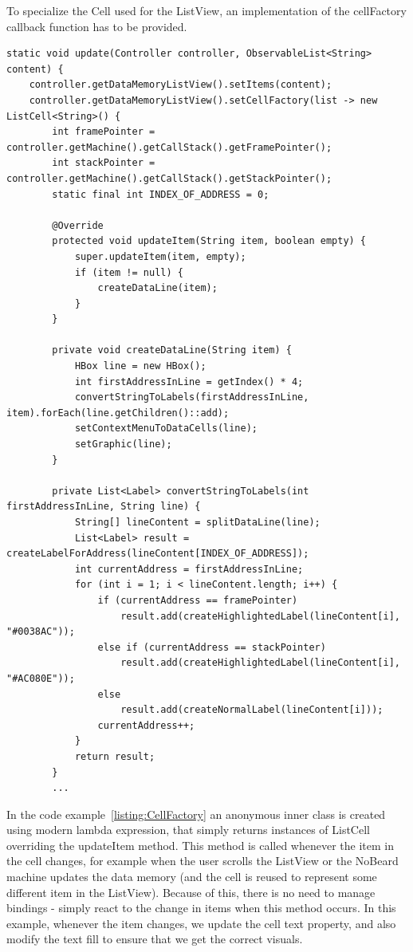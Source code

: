 To specialize the Cell used for the ListView, an implementation of the cellFactory callback function has to be provided.
\begin{lstlisting}[caption={Implementation of the data memory view using cell factory},label=listing:CellFactory]
static void update(Controller controller, ObservableList<String> content) {
    controller.getDataMemoryListView().setItems(content);
    controller.getDataMemoryListView().setCellFactory(list -> new ListCell<String>() {
        int framePointer = controller.getMachine().getCallStack().getFramePointer();
        int stackPointer = controller.getMachine().getCallStack().getStackPointer();
        static final int INDEX_OF_ADDRESS = 0;

        @Override
        protected void updateItem(String item, boolean empty) {
            super.updateItem(item, empty);
            if (item != null) {
                createDataLine(item);
            }
        }

        private void createDataLine(String item) {
            HBox line = new HBox();
            int firstAddressInLine = getIndex() * 4;
            convertStringToLabels(firstAddressInLine, item).forEach(line.getChildren()::add);
            setContextMenuToDataCells(line);
            setGraphic(line);
        }

        private List<Label> convertStringToLabels(int firstAddressInLine, String line) {
            String[] lineContent = splitDataLine(line);
            List<Label> result = createLabelForAddress(lineContent[INDEX_OF_ADDRESS]);
            int currentAddress = firstAddressInLine;
            for (int i = 1; i < lineContent.length; i++) {
                if (currentAddress == framePointer)
                    result.add(createHighlightedLabel(lineContent[i], "#0038AC"));
                else if (currentAddress == stackPointer)
                    result.add(createHighlightedLabel(lineContent[i], "#AC080E"));
                else
                    result.add(createNormalLabel(lineContent[i]));
                currentAddress++;
            }
            return result;
        }
        ...
\end{lstlisting}
In the code example~\ref{listing:CellFactory} an anonymous inner class is created using modern lambda expression, that simply returns instances of ListCell overriding the updateItem method. This method is called whenever the item in the cell changes, for example when the user scrolls the ListView or the NoBeard machine updates the data memory (and the cell is reused to represent some different item in the ListView). Because of this, there is no need to manage bindings - simply react to the change in items when this method occurs. In this example, whenever the item changes, we update the cell text property, and also modify the text fill to ensure that we get the correct visuals.
